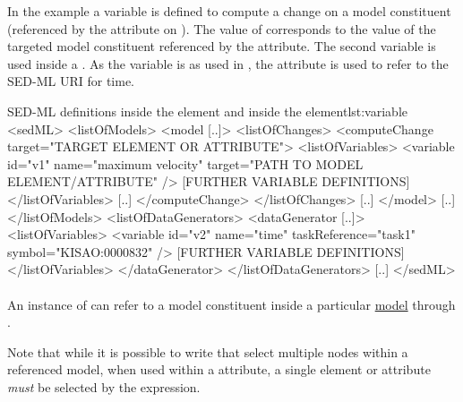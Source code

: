 In the example a variable  is defined to compute a change on a model constituent (referenced by the \hyperref[sec:target]{} attribute on \hyperref[class:computeChange]{}). The value of  corresponds to the value of the targeted model constituent referenced by the  attribute. The second variable  is used inside a \hyperref[class:dataGenerator]{}. As the variable is  as used in , the \hyperref[sec:symbol]{} attribute is used to refer to the SED-ML URI for time.

\begin{myXmlLst}{SED-ML  definitions inside the  element and inside the  element}{lst:variable}
<sedML>
	<listOfModels>
		<model [..]>
			<listOfChanges>
				<computeChange target="TARGET ELEMENT OR ATTRIBUTE">
				<listOfVariables>
				   <variable id="v1" name="maximum velocity" target="PATH TO MODEL ELEMENT/ATTRIBUTE" />
				   [FURTHER VARIABLE DEFINITIONS]
				</listOfVariables>
				[..]
				</computeChange>
			</listOfChanges>
			[..]
		</model>
		[..]
	</listOfModels>
	<listOfDataGenerators>
		<dataGenerator [..]>
			<listOfVariables>
				<variable id="v2" name="time" taskReference="task1" symbol="KISAO:0000832" />
				[FURTHER VARIABLE DEFINITIONS]
			</listOfVariables>
		</dataGenerator>
	</listOfDataGenerators>
	[..]
</sedML>
\end{myXmlLst}


\paragraph*{}
\label{sec:target}
An instance of \Variable can refer to a model constituent inside a particular \hyperref[class:model]{model} through . 

Note that while it is possible to write  that select multiple nodes within a referenced model, when used within a  attribute, a single element or attribute \emph{must} be selected by the expression.

